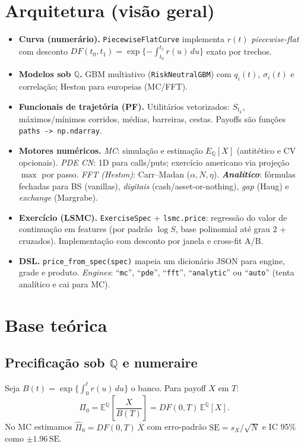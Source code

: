 ﻿\documentclass[11pt,a4paper]{article}
\begin{document}
\section{Arquitetura (visão geral)}
\begin{itemize}[leftmargin=1.2em]
\item \textbf{Curva (numerário).} \texttt{PiecewiseFlatCurve} implementa $r(t)$ \emph{piecewise-flat} com desconto
$DF(t_0,t_1)=\exp\{-\int_{t_0}^{t_1} r(u)\,du\}$ exato por trechos.
\item \textbf{Modelos sob $\mathbb{Q}$.}
GBM multiativo (\texttt{RiskNeutralGBM}) com $q_i(t)$, $\sigma_i(t)$ e correlação; Heston para europeias (MC/FFT).
\item \textbf{Funcionais de trajetória (PF).} Utilitários vetorizados: $S_{t_k}$, máximos/mínimos corridos, médias, barreiras, cestas.
Payoffs são funções \verb|paths -> np.ndarray|.
\item \textbf{Motores numéricos.}
\emph{MC}: simulação e estimação $E_{\mathbb Q}[X]$ (antitético e CV opcionais).
\emph{PDE CN}: 1D para calls/puts; exercício americano via projeção $\max$ por passo.
\emph{FFT (Heston)}: Carr--Madan ($\alpha,N,\eta$).
\textbf{\emph{Analítico}}: fórmulas fechadas para BS (vanillas), \emph{digitais} (cash/asset-or-nothing), \emph{gap} (Haug) e \emph{exchange} (Margrabe).
\item \textbf{Exercício (LSMC).} \texttt{ExerciseSpec} + \texttt{lsmc.price}: regressão do valor de continuação em features (por padrão $\log S$,
base polinomial até grau 2 + cruzados). Implementação com desconto por janela e cross-fit A/B.
\item \textbf{DSL.} \texttt{price\_from\_spec(spec)} mapeia um dicionário JSON para engine, grade e produto.
\emph{Engines}: ``\texttt{mc}'', ``\texttt{pde}'', ``\texttt{fft}'', ``\texttt{analytic}'' ou ``\texttt{auto}'' (tenta analítico e cai para MC).
\end{itemize}

\section{Base teórica}

\subsection{Precificação sob $\mathbb{Q}$ e numeraire}
Seja $B(t)=\exp\{\int_0^t r(u)\,du\}$ o banco. Para payoff $X$ em $T$:
\[
\Pi_0=\mathbb E^{\mathbb Q}\!\left[\frac{X}{B(T)}\right]=DF(0,T)\,\mathbb E^{\mathbb Q}[X].
\]
No MC estimamos $\hat \Pi_0 = DF(0,T)\,\overline{X}$ com erro-padrão 
$\mathrm{SE}=s_X/\sqrt{N}$ e IC 95\% como $\pm 1.96\,\mathrm{SE}$.
\end{document}
